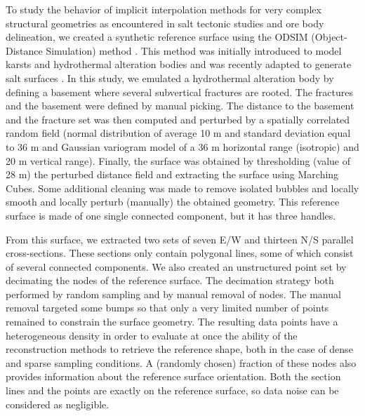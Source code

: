 \documentclass[final]{ring20}
\begin{document}
{To study the behavior of implicit interpolation methods for very complex structural geometries as encountered in salt tectonic studies and ore body delineation, we created a synthetic reference surface using the ODSIM (Object-Distance Simulation) method \citep{Henrion2010MG}. This method was initially introduced to model karsts and hydrothermal alteration bodies \citep{Henrion2008PEIGC,Rongier2014G} and was recently adapted to generate salt surfaces \citep{Clausolles20188ECE2}. In this study, we emulated a hydrothermal alteration body by defining a basement where several subvertical fractures are rooted. The fractures and the basement were defined by manual picking. The distance to the basement and the fracture set was then computed and perturbed by a spatially correlated random field (normal distribution of average 10 m and standard deviation equal to 36 m and Gaussian variogram model of a 36 m horizontal range (isotropic) and 20 m vertical range). Finally, the surface was obtained 
by thresholding (value of 28 m) the perturbed distance field and extracting the surface using Marching Cubes. Some additional cleaning was made to remove isolated bubbles and locally smooth and locally perturb (manually) the obtained geometry. This reference surface is made of one single connected component, but it has three handles. 

From this surface, we extracted two sets of seven E/W and thirteen N/S parallel cross-sections. These sections only contain polygonal lines, some of which consist of several connected components. We also created an unstructured point set by decimating the nodes of the reference surface. The decimation strategy both performed by random sampling and by manual removal of nodes. The manual removal targeted some bumps so that only a very limited number of points remained to constrain the surface geometry. The resulting data points have a heterogeneous density in order to evaluate at once the ability of the reconstruction methods to retrieve the reference shape, both in the case of dense and sparse sampling conditions. A (randomly chosen) fraction of these nodes also provides information about the reference surface orientation. Both the section lines and the points are exactly on the reference surface, so data noise can be considered as negligible. 


}
\end{document}

